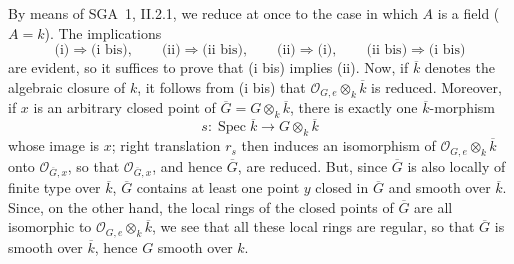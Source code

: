 By means of SGA~1, II.2.1, we reduce at once to the case in which
\(A\) is a field (\(A=k\)). The implications
\[
  \text{(i)}\Rightarrow\text{(i bis)},\qquad
  \text{(ii)}\Rightarrow\text{(ii bis)},\qquad
  \text{(ii)}\Rightarrow\text{(i)},\qquad
  \text{(ii bis)}\Rightarrow\text{(i bis)}
\]
are evident, so it suffices to prove that (i bis) implies (ii).
Now, if \(\overline k\) denotes the algebraic closure of \(k\), it
follows from (i bis) that \(\mathcal O_{G,e}\otimes_k\overline k\) is
reduced. Moreover, if \(x\) is an arbitrary closed point of
\(\overline G=G\otimes_k\overline k\), there is exactly one
\(\overline k\)-morphism
\[
  s:\operatorname{Spec}\overline k\longrightarrow G\otimes_k\overline k
\]
whose image is \(x\); right translation \(r_s\) then induces an
isomorphism of \(\mathcal O_{G,e}\otimes_k\overline k\) onto
\(\mathcal O_{\overline G,x}\), so that \(\mathcal O_{\overline G,x}\),
and hence \(\overline G\), are reduced. But, since \(\overline G\) is also
locally of finite type over \(\overline k\), \(\overline G\) contains at
least one point \(y\) closed in \(\overline G\) and smooth over
\(\overline k\). Since, on the other hand, the local rings of the closed
points of \(\overline G\) are all isomorphic to
\(\mathcal O_{G,e}\otimes_k\overline k\), we see that all these local
rings are regular, so that \(\overline G\) is smooth over
\(\overline k\), hence \(G\) smooth over \(k\).
